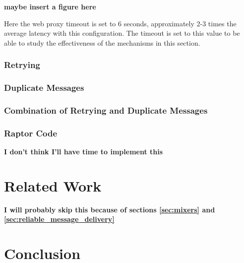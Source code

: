 \documentclass[a4paper,11pt,oneside]{report}
\begin{document}
\textbf{maybe insert a figure here}

Here the web proxy timeout is set to 6 seconds, approximately 2-3 times the average latency with this configuration. The timeout is set to this value to be able to study the effectiveness of the mechanisms in this section.
\subsection{Retrying}

\subsection{Duplicate Messages}

\subsection{Combination of Retrying and Duplicate Messages}

\subsection{Raptor Code}
\textbf{I don't think I'll have time to implement this}

\chapter{Related Work}



\textbf{I will probably skip this because of sections \autoref{sec:mixers} and \autoref{sec:reliable_message_delivery}}

\chapter{Conclusion}

\end{document}

